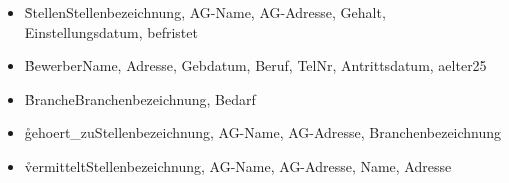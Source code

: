 \documentclass{bschlangaul-aufgabe}
\begin{document}
\begin{itemize}
\item \r{Stellen}{Stellenbezeichnung, AG-Name, AG-Adresse, Gehalt,
Einstellungsdatum, befristet}

\item \r{Bewerber}{Name, Adresse, Gebdatum, Beruf, TelNr,
Antrittsdatum, aelter25}

\item \r{Branche}{Branchenbezeichnung, Bedarf}

\item \r{gehoert\_zu}{Stellenbezeichnung, AG-Name, AG-Adresse,
Branchenbezeichnung}

\item \r{vermittelt}{Stellenbezeichnung, AG-Name, AG-Adresse,
Name, Adresse}
\end{itemize}
\end{document}
